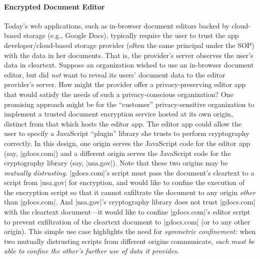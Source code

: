 \paragraph{Encrypted Document Editor}
Today's web applications, such as in-browser document editors backed
by cloud-based storage (e.g., Google Docs), typically require the user
to trust the app developer/cloud-based storage provider (often the
same principal under the SOP) with the data in her documents. That is,
the provider's server observes the user's data in cleartext. Suppose
an organization wished to use an in-browser document editor, but did
{\em not} want to reveal its users' document data to the editor
provider's server. How might the provider offer a privacy-preserving
editor app that would satisfy the needs of such a privacy-conscious
organization?  One promising approach might be for the ``customer''
privacy-sensitive organization to implement a trusted document encryption
service hosted at its own origin, distinct from that which hosts the
editor app. The editor app could allow the user to specify a JavaScript
``plugin'' library she trusts to perform cryptography correctly. In this design,
one origin serves the JavaScript code for the editor app (say,
\js|gdocs.com|) and a different origin serves the JavaScript code for
the cryptography library (say, \js|nsa.gov|). Note that these two
origins may be {\em mutually distrusting.}  \js|gdocs.com|'s script
must pass the document's cleartext to a script from \js|nsa.gov| for
encryption, and would like to confine the execution of the encryption
script so that it cannot exfiltrate the document to any origin {\em
other} than \js|gdocs.com|. And \js|nsa.gov|'s cryptography library
does not trust \js|gdocs.com| with the cleartext document---it would
like to confine \js|gdocs.com|'s editor script to prevent
exfiltration of the cleartext document to \js|gdocs.com| (or to any
other origin).
%
This simple use case highlights the need for {\em
  symmetric confinement:} when two mutually distrusting scripts from
different origins communicate, {\em each must be able to confine the
  other's further use of data it provides.}
%

